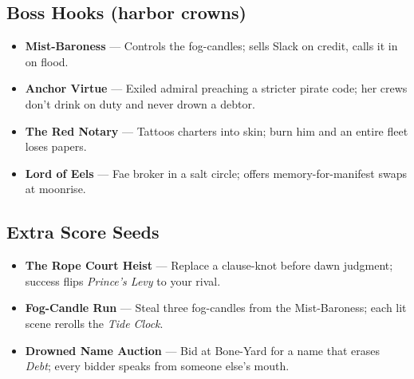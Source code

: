 \subsection*{Boss Hooks (harbor crowns)}
\begin{itemize}
  \item \textbf{Mist-Baroness} — Controls the fog-candles; sells Slack on credit, calls it in on flood.
  \item \textbf{Anchor Virtue} — Exiled admiral preaching a stricter pirate code; her crews don’t drink on duty and never drown a debtor.
  \item \textbf{The Red Notary} — Tattoos charters into skin; burn him and an entire fleet loses papers.
  \item \textbf{Lord of Eels} — Fae broker in a salt circle; offers memory-for-manifest swaps at moonrise.
\end{itemize}

\subsection*{Extra Score Seeds}
\begin{itemize}
  \item \textbf{The Rope Court Heist} — Replace a clause-knot before dawn judgment; success flips \emph{Prince’s Levy} to your rival.
  \item \textbf{Fog-Candle Run} — Steal three fog-candles from the Mist-Baroness; each lit scene rerolls the \emph{Tide Clock}.
  \item \textbf{Drowned Name Auction} — Bid at Bone-Yard for a name that erases \emph{Debt}; every bidder speaks from someone else’s mouth.
\end{itemize}